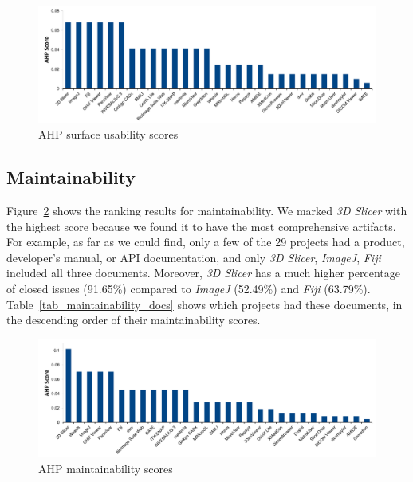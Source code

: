 \documentclass[final, 3p, times, authoryear]{elsarticle}
\begin{document}
\begin{figure}[!ht]
\includegraphics[scale=0.48]{figures/usability_scores.pdf}
\caption{AHP surface usability scores}
\label{fg_usability_scores}
\end{figure}
 
\subsection{Maintainability} \label{sec_score_maintainability}

Figure~\ref{fg_maintainability_scores} shows the ranking results for
maintainability. We marked \textit{3D Slicer} with the highest score because
we found it to have the most comprehensive artifacts. For example, as far as we
could find, only a few of the 29 projects had a product, developer's
manual, or API documentation, and only \textit{3D Slicer}, \textit{ImageJ},
\textit{Fiji} included all three documents. Moreover, \textit{3D Slicer} has a
much higher percentage of closed issues (91.65\%) compared to \textit{ImageJ}
(52.49\%) and \textit{Fiji} (63.79\%). Table~\ref{tab_maintainability_docs}
shows which projects had these documents, in the descending order of their
maintainability scores. 

\begin{figure}[!ht]
\includegraphics[scale=0.48]{figures/maintainability_scores.pdf}
\caption{AHP maintainability scores}
\label{fg_maintainability_scores}
\end{figure}
\end{document}
